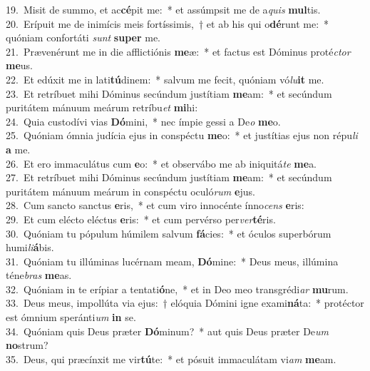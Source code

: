 {19.~}Misit de summo, et ac\textbf{cé}pit me:~* et assúmpsit me de a\textit{quis} \textbf{mul}tis.\\
{20.~}Erípuit me de inimícis meis fortíssimis,~† et ab his qui o\textbf{dé}runt me:~* quóniam confortáti \textit{sunt} \textbf{su}\textbf{per} me.\\
{21.~}Prævenérunt me in die afflictiónis \textbf{me}æ:~* et factus est Dóminus proté\textit{ctor} \textbf{me}us.\\
{22.~}Et edúxit me in lati\textbf{tú}dinem:~* salvum me fecit, quóniam vó\textit{lu}\textbf{it} me.\\
{23.~}Et retríbuet mihi Dóminus secúndum justítiam \textbf{me}am:~* et secúndum puritátem mánuum meárum retríbu\textit{et} \textbf{mi}hi:\\
{24.~}Quia custodívi vias \textbf{Dó}mini,~* nec ímpie gessi a De\textit{o} \textbf{me}o.\\
{25.~}Quóniam ómnia judícia ejus in conspéctu \textbf{me}o:~* et justítias ejus non répu\textit{li} \textbf{a} me.\\
{26.~}Et ero immaculátus cum \textbf{e}o:~* et observábo me ab iniquitá\textit{te} \textbf{me}a.\\
{27.~}Et retríbuet mihi Dóminus secúndum justítiam \textbf{me}am:~* et secúndum puritátem mánuum meárum in conspéctu oculó\textit{rum} \textbf{e}jus.\\
{28.~}Cum sancto sanctus \textbf{e}ris,~* et cum viro innocénte ínno\textit{cens} \textbf{e}ris:\\
{29.~}Et cum elécto eléctus \textbf{e}ris:~* et cum pervérso per\textit{ver}\textbf{té}ris.\\
{30.~}Quóniam tu pópulum húmilem salvum \textbf{fá}cies:~* et óculos superbórum humi\textit{li}\textbf{á}bis.\\
{31.~}Quóniam tu illúminas lucérnam meam, \textbf{Dó}mine:~* Deus meus, illúmina téne\textit{bras} \textbf{me}as.\\
{32.~}Quóniam in te erípiar a tentati\textbf{ó}ne,~* et in Deo meo transgrédi\textit{ar} \textbf{mu}rum.\\
{33.~}Deus meus, impollúta via ejus:~† elóquia Dómini igne exami\textbf{ná}ta:~* protéctor est ómnium speránti\textit{um} \textbf{in} se.\\
{34.~}Quóniam quis Deus præter \textbf{Dó}minum?~* aut quis Deus præter De\textit{um} \textbf{no}strum?\\
{35.~}Deus, qui præcínxit me vir\textbf{tú}te:~* et pósuit immaculátam vi\textit{am} \textbf{me}am.\\
